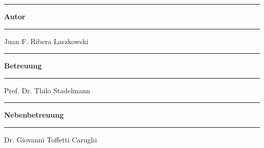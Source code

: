 \begin{titlepage}
\begin{minipage}[b]{0.84\textwidth}
	

	\begin{minipage}[b]{0.27\textwidth}
	\hrule\vskip 0.5cm
		\textbf{Autor}\\
	\end{minipage}
	\begin{minipage}[b]{0.03\textwidth}
	\hskip 0.5cm
	\end{minipage}
	\begin{minipage}[b]{0.7\textwidth}
	\hrule\vskip 0.5cm
		Juan F. Ribera Laszkowski \\
	\end{minipage}

	
	\begin{minipage}[b]{0.27\textwidth}
	\hrule\vskip 0.5cm
		\textbf{Betreuung}\\
	\end{minipage}
	\begin{minipage}[b]{0.03\textwidth}
	\hskip 0.5cm
	\end{minipage}
	\begin{minipage}[b]{0.7\textwidth}
	\hrule\vskip 0.5cm
		Prof. Dr. Thilo Stadelmann \\
	\end{minipage}

	
	\begin{minipage}[b]{0.27\textwidth}
	\hrule\vskip 0.5cm
		\textbf{Nebenbetreuung}\\
	\end{minipage}
	\begin{minipage}[b]{0.03\textwidth}
	\hskip 0.5cm
	\end{minipage}
	\begin{minipage}[b]{0.7\textwidth}
	\hrule\vskip 0.5cm
		Dr. Giovanni Toffetti Carughi \\
	\end{minipage}
	
	

\end{minipage}
\end{titlepage}
